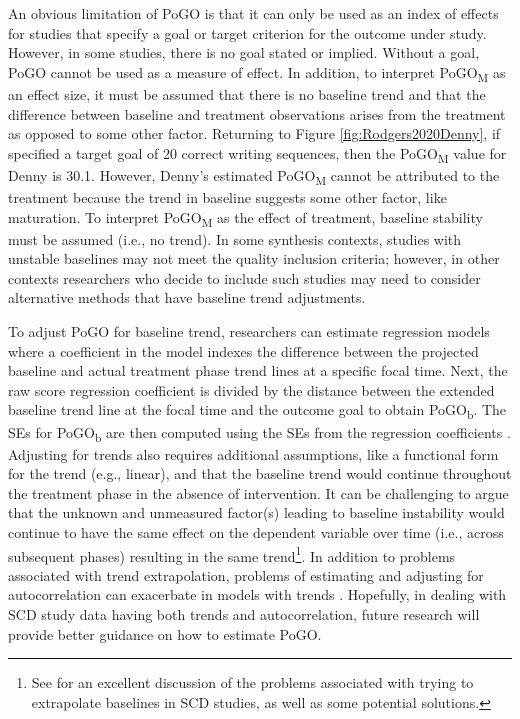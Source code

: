 \documentclass[
]{book}
\begin{document}
An obvious limitation of PoGO is that it can only be used as an index of effects for studies that specify a goal or target criterion for the outcome under study. However, in some studies, there is no goal stated or implied. Without a goal, PoGO cannot be used as a measure of effect. In addition, to interpret PoGO\textsubscript{M} as an effect size, it must be assumed that there is no baseline trend and that the difference between baseline and treatment observations arises from the treatment as opposed to some other factor. Returning to Figure \ref{fig:Rodgers2020Denny}, if \citet{rodgers2021Effects} specified a target goal of 20 correct writing sequences, then the PoGO\textsubscript{M} value for Denny is 30.1. However, Denny's estimated PoGO\textsubscript{M} cannot be attributed to the treatment because the trend in baseline suggests some other factor, like maturation. To interpret PoGO\textsubscript{M} as the effect of treatment, baseline stability must be assumed (i.e., no trend). In some synthesis contexts, studies with unstable baselines may not meet the quality inclusion criteria; however, in other contexts researchers who decide to include such studies may need to consider alternative methods that have baseline trend adjustments.

To adjust PoGO for baseline trend, researchers can estimate regression models where a coefficient in the model indexes the difference between the projected baseline and actual treatment phase trend lines at a specific focal time. Next, the raw score regression coefficient is divided by the distance between the extended baseline trend line at the focal time and the outcome goal to obtain PoGO\textsubscript{b}. The SEs for PoGO\textsubscript{b} are then computed using the SEs from the regression coefficients \citep{Patrona2022}. Adjusting for trends also requires additional assumptions, like a functional form for the trend (e.g., linear), and that the baseline trend would continue throughout the treatment phase in the absence of intervention. It can be challenging to argue that the unknown and unmeasured factor(s) leading to baseline instability would continue to have the same effect on the dependent variable over time (i.e., across subsequent phases) resulting in the same trend\footnote{See for an excellent discussion of the problems associated with trying to extrapolate baselines in SCD studies, as well as some potential solutions.}. In addition to problems associated with trend extrapolation, problems of estimating and adjusting for autocorrelation can exacerbate in models with trends \citep{Ferron_2002, NatesanBatley_Hedges_2021}. Hopefully, in dealing with SCD study data having both trends and autocorrelation, future research will provide better guidance on how to estimate PoGO.
\end{document}
